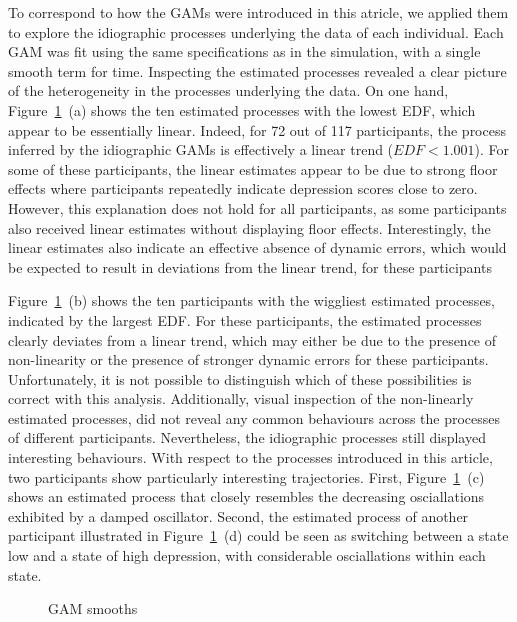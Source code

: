 \documentclass[man, floatsintext]{apa7}
\begin{document}
To correspond to how the GAMs were introduced in this atricle, we applied them
to explore the idiographic processes underlying the data of each individual.
Each GAM was fit using the same specifications as in the simulation, with a
single smooth term for time. Inspecting the estimated processes revealed a
clear picture of the heterogeneity in the processes underlying the data. On one
hand, Figure~\ref{fig:dem_smooth}~(a) shows the ten estimated processes with
the lowest EDF, which appear to be essentially linear. Indeed, for 72 out of
117 participants, the process inferred by the idiographic GAMs is effectively a
linear trend ($EDF < 1.001$). For some of these participants, the linear
estimates appear to be due to strong floor effects where participants
repeatedly indicate depression scores close to zero. However, this explanation
does not hold for all participants, as some participants also received linear
estimates without displaying floor effects. Interestingly, the linear estimates
also indicate an effective absence of dynamic errors, which would be expected
to result in deviations from the linear trend, for these participants

Figure~\ref{fig:dem_smooth}~(b) shows the ten participants with the wiggliest
estimated processes, indicated by the largest EDF\@. For these participants,
the estimated processes clearly deviates from a linear trend, which may either
be due to the presence of non-linearity or the presence of stronger dynamic
errors for these participants. Unfortunately, it is not possible to distinguish
which of these possibilities is correct with this analysis. Additionally,
visual inspection of the non-linearly estimated processes, did not reveal any
common behaviours across the processes of different participants. Nevertheless,
the idiographic processes still displayed interesting behaviours. With respect
to the processes introduced in this article, two participants show particularly
interesting trajectories. First, Figure~\ref{fig:dem_smooth}~(c) shows an
estimated process that closely resembles the decreasing osciallations exhibited
by a damped oscillator. Second, the estimated process of another participant
illustrated in Figure~\ref{fig:dem_smooth}~(d) could be seen as switching
between a state low and a state of high depression, with considerable
osciallations within each state.

\begin{figure}[!t]
  \caption{GAM smooths}
  \label{fig:dem_smooth}
\end{figure}
\end{document}
